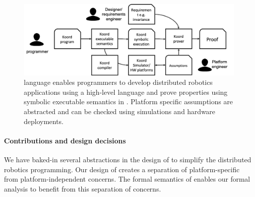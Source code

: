 \begin{figure}[h!]
\includegraphics[width=\linewidth]{figs/koorduser.png}
\caption{\small \lgname language enables programmers to develop distributed robotics applications using a high-level language and prove properties using symbolic executable semantics in \K.
    Platform specific assumptions are abstracted and can be checked using simulations and hardware deployments.}
\label{fig:koorduser}
\end{figure}


\paragraph{Contributions and design decisions}

We have baked-in several abstractions in the design of \lgname to simplify the distributed robotics programming.
Our design of \lgname creates a separation of platform-specific from platform-independent concerns.
The formal semantics of \lgname enables our formal analysis to benefit from this separation of concerns.

